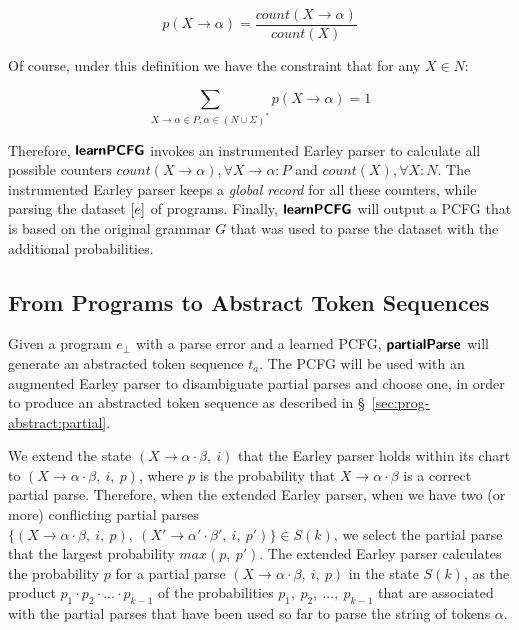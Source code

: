 \begin{equation*}
    p(X \rightarrow \alpha) = \frac{count(X \rightarrow \alpha)}{count(X)}
\end{equation*}

Of course, under this definition we have the constraint that for any $X \in N$:

\begin{equation*}
    \sum_{X \rightarrow \alpha \in P, \alpha \in (N \cup \Sigma)^{\ast}}{p(X \rightarrow \alpha)} = 1
\end{equation*}

Therefore, $\bm{\mathsf{learnPCFG}}$ invokes an instrumented Earley parser to calculate
all possible counters $count(X \rightarrow \alpha), \forall X \rightarrow
\alpha: P$ and $count(X), \forall X: N$. The instrumented Earley parser keeps a
\emph{global record} for all these counters, while parsing the dataset
$[e]$ of programs. Finally, $\bm{\mathsf{learnPCFG}}$ will output a PCFG that is
based on the original grammar $G$ that was used to parse the dataset with the
additional probabilities.


\subsection{From Programs to Abstract Token Sequences}

Given a program $e_{\bot}$ with a parse error and a learned PCFG, $\bm{\mathsf{partialParse}}$
will generate an abstracted token sequence $t_a$. The PCFG will be used with an
augmented Earley parser to disambiguate partial parses and choose one, in order
to produce an abstracted token sequence as described in
\S~\ref{sec:prog-abstract:partial}.

We extend the state $(X \rightarrow \alpha \cdot \beta,\ i)$ that the Earley
parser holds within its chart to $(X \rightarrow \alpha \cdot \beta,\ i,\ p)$,
where $p$ is the probability that $X \rightarrow \alpha \cdot \beta$ is a
correct partial parse. Therefore, when the extended Earley parser, when we have
two (or more) conflicting partial parses $\{(X \rightarrow \alpha \cdot \beta,\
i,\ p),\ (X' \rightarrow \alpha' \cdot \beta',\ i,\ p')\} \in S(k)$, we select
the partial parse that the largest probability $max(p,\ p')$. The extended
Earley parser calculates the probability $p$ for a partial parse $(X \rightarrow
\alpha \cdot \beta,\ i,\ p)$ in the state $S(k)$, as the product $p_1 \cdot p_2
\cdot ... \cdot p_{k-1}$ of the probabilities $p_1,\ p_2,\ ...,\ p_{k-1}$ that
are associated with the partial parses that have been used so far to parse the
string of tokens $\alpha$.




